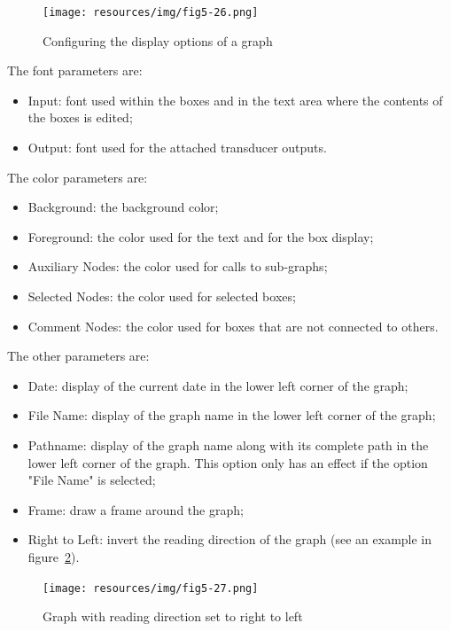 \begin{figure}[!ht]
\begin{center}
\texttt{[image: resources/img/fig5-26.png]}
\caption{Configuring the display options of a graph\label{fig-graph-display-configuration}}
\end{center}
\end{figure}

\bigskip
\noindent The font parameters are:
\begin{itemize}
  \item Input: font used within the boxes and in the text area where the
  contents of the boxes is edited;
  
  \item Output: font used for the attached transducer outputs.
\end{itemize}

\bigskip
\noindent The color parameters are:
\begin{itemize}
  \item Background: the background color;
  \item Foreground: the color used for the text and for the box display;
  \item Auxiliary Nodes: the color used for calls to sub-graphs;
  \item Selected Nodes: the color used for selected boxes;
  \item Comment Nodes: the color used for boxes that are not connected to others.
\end{itemize}

\bigskip
\noindent The other parameters are:
\begin{itemize}
  \item Date: display of the current date in the lower left corner of the graph;
  \item File Name: display of the graph name in the lower left corner of the graph;
  \item Pathname: display of the graph name along with its complete path in the
  lower left corner of the graph. This option only has an effect if the option
  "File Name" is selected;
  \item Frame: draw a frame around the graph;
  \item Right to Left: invert the reading direction of the graph (see an example
  in figure~\ref{fig-right-to-left-graph}).
\end{itemize}

\bigskip
\begin{figure}[!ht]
\begin{center}
\texttt{[image: resources/img/fig5-27.png]}
\caption{Graph with reading direction set to right to left\label{fig-right-to-left-graph}}
\end{center}
\end{figure}

